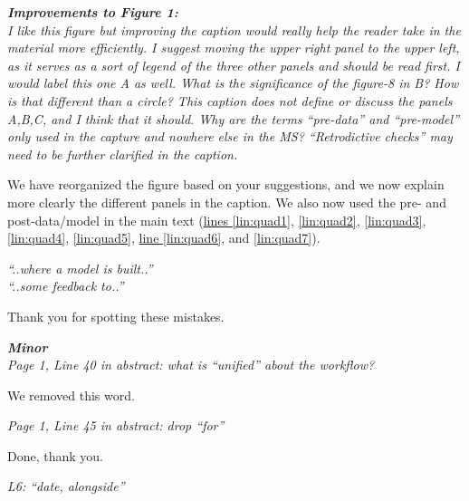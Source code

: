\documentclass[11pt,letter]{article}
\begin{document}
\begin{mybox}
\emph{\textbf{Improvements to Figure 1:}\\
I like this figure but improving the caption would really help the reader take in the material more efficiently. I suggest moving the upper right panel to the upper left, as it serves as a sort of legend of the three other panels and should be read first. I would label this one A as well. What is the significance of the figure-8 in B? How is that different than a circle? This caption does not define or discuss the panels A,B,C, and I think that it should. Why are the terms “pre-data” and “pre-model” only used in the capture and nowhere else in the MS? “Retrodictive checks” may need to be further clarified in the caption.}
\end{mybox}

We have reorganized the figure based on your suggestions, and we now explain more clearly the different panels in the caption.
We also now used the pre- and post-data/model in the main text (\href{file:forecastflows_r1\#lintarget:quad1}{lines \ref*{lin:quad1}}, \href{file:forecastflows_r1\#lintarget:quad2}{\ref*{lin:quad2}}, \href{file:forecastflows_r1\#lintarget:quad3}{\ref*{lin:quad3}}, \href{file:forecastflows_r1\#lintarget:quad4}{\ref*{lin:quad4}}, \href{file:forecastflows_r1\#lintarget:quad5}{\ref*{lin:quad5}}, \href{file:forecastflows_r1\#lintarget:quad6}{line \ref*{lin:quad6}}, and \href{file:forecastflows_r1\#lintarget:quad7}{\ref*{lin:quad7}}).

\begin{mybox}
\emph{“..where a model is built..”\\
“..some feedback to..”}
\end{mybox}

Thank you for spotting these mistakes.

\begin{mybox}
\emph{\textbf{Minor}\\
Page 1, Line 40 in abstract: what is “unified” about the workflow?}
\end{mybox}

We removed this word.

\begin{mybox}
\emph{Page 1, Line 45 in abstract: drop “for”}
\end{mybox}

Done, thank you.

\begin{mybox}
\emph{L6: “date, alongside”}
\end{mybox}
\end{document}
